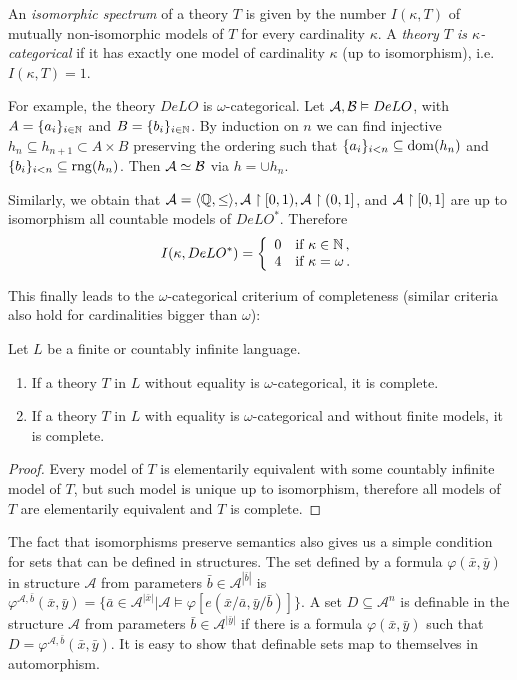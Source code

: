 An \emph{isomorphic spectrum} of a theory $T$ is given by the number $I(\kappa, T)$ of mutually non-isomorphic models of $T$ for every cardinality $\kappa$. A \emph{theory $T$ is $\kappa$-categorical} if it has exactly one model of cardinality $\kappa$ (up to isomorphism), i.e. $I(\kappa, T) = 1$. 

For example, the theory $DeLO$ is $\omega$-categorical. Let $\mathcal{A}, \mathcal{B} \vDash DeLO$, with $A = \{a_i\}_{i \in \mathbb{N}}$ and $B = \{b_i\}_{i \in \mathbb{N}}$. By induction on $n$ we can find injective $h_n \subseteq h_{n+1} \subset A \times B$ preserving the ordering such that $\{a_i\}_{i < n} \subseteq \operatorname{dom}(h_n)$ and $\{b_i\}_{i<n} \subseteq \operatorname{rng}(h_n)$. Then $\mathcal{A} \simeq \mathcal{B}$ via $h = \cup h_n$.

Similarly, we obtain that $\mathcal{A} = \langle \mathbb{Q}, \leq \rangle, \mathcal{A} \upharpoonright [0, 1), \mathcal{A} \upharpoonright (0, 1]$, and $\mathcal{A} \upharpoonright [0, 1]$ are up to isomorphism all countable models of $DeLO^*$. Therefore $$I(\kappa, DeLO^*) = \left\{ \begin{array}{ll} 0 & \text{if } \kappa \in \mathbb{N}\,, \\ 4 & \text{if } \kappa = \omega\,. \end{array} \right.$$

This finally leads to the $\omega$-categorical criterium of completeness (similar criteria also hold for cardinalities bigger than $\omega$):

\begin{theorem}
Let $L$ be a finite or countably infinite language.
\begin{enumerate}
	\item If a theory $T$ in $L$ without equality is $\omega$-categorical, it is complete.
	\item If a theory $T$ in $L$ with equality is $\omega$-categorical and without finite models, it is complete.
\end{enumerate}
\end{theorem}
\begin{proof}
Every model of $T$ is elementarily equivalent with some countably infinite model of $T$, but such model is unique up to isomorphism, therefore all models of $T$ are elementarily equivalent and $T$ is complete.
\end{proof}

The fact that isomorphisms preserve semantics also gives us a simple condition for sets that can be defined in structures. The set defined by a formula $\varphi(\bar{x}, \bar{y})$ in structure $\mathcal{A}$ from parameters $\bar{b}\in \mathcal{A}^{|\bar{b}|}$ is $\varphi^{\mathcal{A}, \bar{b}}(\bar{x}, \bar{y}) = \{\bar{a} \in \mathcal{A}^{|\bar{x}|} | \mathcal{A} \vDash \varphi[e(\bar{x}/\bar{a}, \bar{y}/\bar{b})]\}$. A set $D \subseteq \mathcal{A}^n$ is definable in the structure $\mathcal{A}$ from parameters $\bar{b} \in \mathcal{A}^{|\bar{y}|}$ if there is a formula $\varphi(\bar{x}, \bar{y})$ such that $D = \varphi^{\mathcal{A}, \bar{b}}(\bar{x}, \bar{y})$. It is easy to show that definable sets map to themselves in automorphism. 

